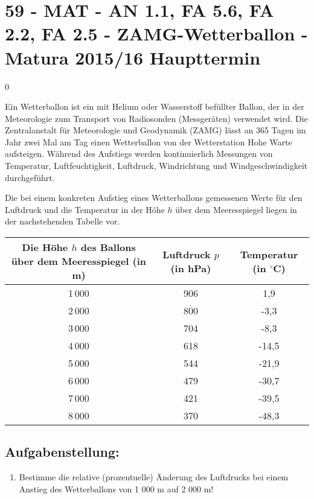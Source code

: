 \section{59 - MAT - AN 1.1, FA 5.6, FA 2.2, FA 2.5 - ZAMG-Wetterballon - Matura 2015/16 Haupttermin}

\begin{langesbeispiel} \item[0] %
	
 Ein Wetterballon ist ein mit Helium oder Wasserstoff befüllter Ballon, der in der Meteorologie zum Transport von Radiosonden (Messgeräten) verwendet wird. Die Zentralanstalt für Meteorologie und Geodynamik (ZAMG) lässt an 365 Tagen im Jahr zwei Mal am Tag einen Wetterballon von der Wetterstation Hohe Warte aufsteigen. Während des Aufstiegs werden kontinuierlich Messungen von Temperatur, Luftfeuchtigkeit, Luftdruck, Windrichtung und Windgeschwindigkeit durchgeführt.

Die bei einem konkreten Aufstieg eines Wetterballons gemessenen Werte für den Luftdruck und die Temperatur in der Höhe $h$ über dem Meeresspiegel liegen in der nachstehenden Tabelle vor.

\begin{center}
	\begin{tabular}{|c|c|c|}\hline
	\multicolumn{1}{|p{5cm}|}{Die Höhe $h$ des Ballons über dem Meeresspiegel (in m)}&Luftdruck $p$ (in hPa)&Temperatur (in $^\circ$C)\\ \hline
	1\,000&906&1,9\\ \hline
	2\,000&800&-3,3\\ \hline
	3\,000&704&-8,3\\ \hline
	4\,000&618&-14,5\\ \hline
	5\,000&544&-21,9\\ \hline
	6\,000&479&-30,7\\ \hline
	7\,000&421&-39,5\\ \hline
	8\,000&370&-48,3\\ \hline	
	\end{tabular}
\end{center}


\subsection{Aufgabenstellung:}
\begin{enumerate}
	\item {} Bestimme die relative (prozentuelle) Änderung des Luftdrucks bei einem Anstieg des Wetterballons von 1 000 m auf 2 000 m!\leer
	

\end{enumerate}
\end{langesbeispiel}
